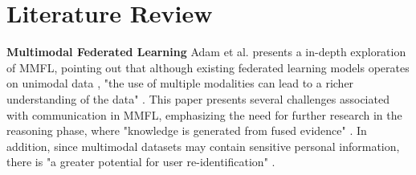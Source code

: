 \documentclass[journal]{IEEEtran} %
\begin{document}


\section{Literature Review}

\vspace{0.5em}
\noindent\textbf{Multimodal Federated Learning}
Adam et al. \cite{b1} presents a in-depth exploration of MMFL, pointing out that although existing federated learning models operates on unimodal data \cite{b1}, "the use of multiple modalities can lead to a richer understanding of the data" \cite{b1}. This paper presents several challenges associated with communication in MMFL, emphasizing the need for further research in the reasoning phase, where "knowledge is generated from fused evidence" \cite{b1}. In addition, since multimodal datasets may contain sensitive personal information, there is "a greater potential for user re-identification" \cite{b1}.
\end{document}
